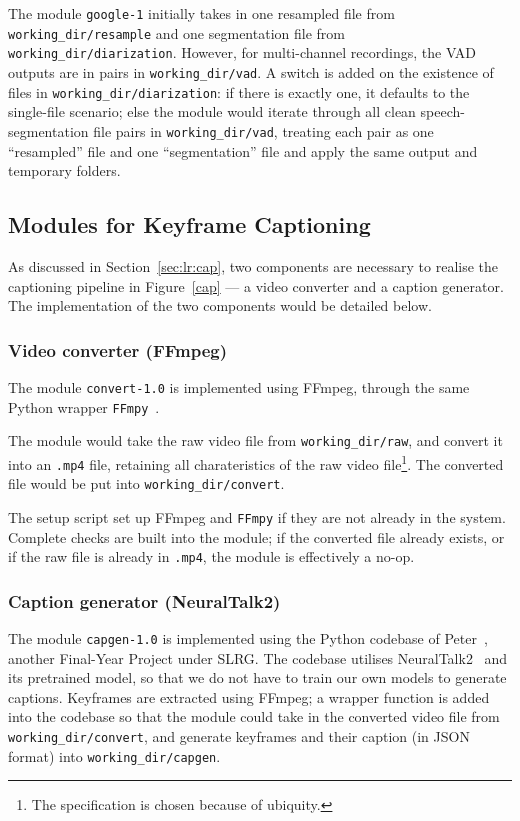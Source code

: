 The module \texttt{google-1} initially takes in one resampled file from
\texttt{working\_dir/resample} and one segmentation file from
\texttt{working\_dir/diarization}. However, for multi-channel recordings,
the VAD outputs are in pairs in \texttt{working\_dir/vad}. A switch is
added on the existence of files in \texttt{working\_dir/diarization}:
if there is exactly one, it defaults to the single-file scenario;
else the module would iterate through all clean speech-segmentation file
pairs in \texttt{working\_dir/vad}, treating each pair as one ``resampled''
file and one ``segmentation'' file and apply the same output and temporary
folders.

\subsection{Modules for Keyframe Captioning}\label{sec:im:code:cap}

As discussed in Section~\ref{sec:lr:cap}, two components are necessary
to realise the captioning pipeline in Figure~\ref{cap} --- a video
converter and a caption generator. The implementation of the two
components would be detailed below.

\subsubsection{Video converter (FFmpeg)}

The module \texttt{convert-1.0} is implemented using FFmpeg, through the
same Python wrapper \texttt{FFmpy}~\cite{ffmpy}.

The module would take the raw video file from \texttt{working\_dir/raw},
and convert it into an \texttt{.mp4} file, retaining all charateristics
of the raw video file\footnote{The specification is chosen because of
ubiquity.}. The converted file would be put into \texttt{working\_dir/convert}.

The setup script set up FFmpeg and \texttt{FFmpy} if they are not already in
the system. Complete checks are built into the module; if the converted file
already exists, or if the raw file is already in \texttt{.mp4}, the
module is effectively a no-op.

\subsubsection{Caption generator (NeuralTalk2)}

The module \texttt{capgen-1.0} is implemented using the Python codebase of
Peter~\cite{peter}, another Final-Year Project under SLRG\@. The codebase
utilises NeuralTalk2~\cite{gh-nrtalk2} and its pretrained model, so that
we do not have to train our own models to generate captions. Keyframes are
extracted using FFmpeg; a wrapper function is added into the codebase so
that the module could take in the converted video file from
\texttt{working\_dir/convert}, and generate keyframes and their caption
(in JSON format) into \texttt{working\_dir/capgen}.

